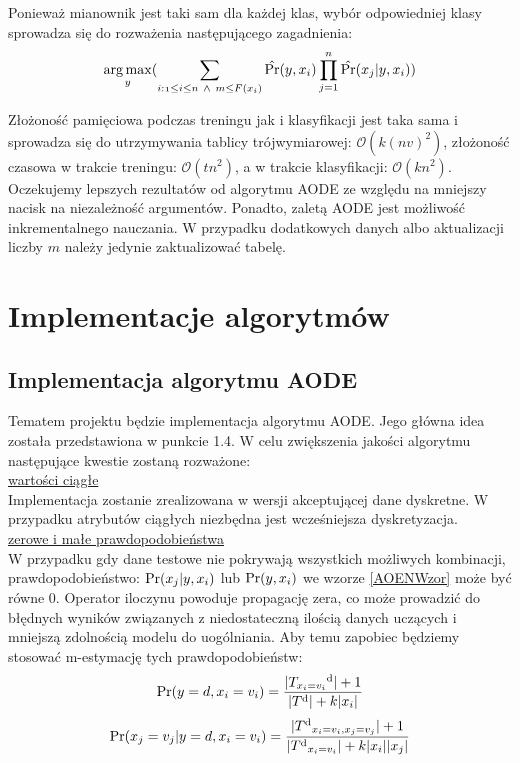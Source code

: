 \documentclass[16]{article}
\begin{document}
Ponieważ mianownik jest taki sam dla każdej klas, wybór odpowiedniej klasy sprowadza się do rozważenia następującego zagadnienia:
\begin{equation}
 \label{AOENWzor}
 \operatorname*{arg\,max}_\mathnormal{y} (\sum_{\mathnormal{i:1 \leq i \leq n \ \wedge \ m \leq F(x_{i})} } \hat{\Pr}(\mathnormal{y, x_{i}})\prod_{j=1}^{n} \hat{\Pr}(\mathnormal{x_{j}|y, x_{i}}))
\end{equation} 

Złożoność pamięciowa podczas treningu jak i klasyfikacji jest taka sama i sprowadza się do utrzymywania tablicy trójwymiarowej: $\mathcal{O}(k(nv)^{2})$, złożoność czasowa w trakcie treningu: $\mathcal{O}(tn^{2})$, a w trakcie klasyfikacji: $\mathcal{O}(kn^{2})$. \\

Oczekujemy lepszych rezultatów od algorytmu AODE ze względu na mniejszy nacisk na niezależność argumentów. Ponadto, zaletą AODE jest możliwość inkrementalnego nauczania. W przypadku dodatkowych danych albo aktualizacji liczby $m$ należy jedynie zaktualizować tabelę.

\section{Implementacje algorytmów}
\subsection{Implementacja algorytmu AODE} 
Tematem projektu będzie implementacja algorytmu AODE. Jego główna idea została przedstawiona w punkcie 1.4. W celu zwiększenia jakości algorytmu następujące kwestie zostaną rozważone: \\

\underline{wartości ciągłe} \\
Implementacja zostanie zrealizowana w wersji akceptującej dane dyskretne. W przypadku atrybutów ciągłych niezbędna jest wcześniejsza dyskretyzacja. \\

\underline{zerowe i małe prawdopodobieństwa} \\
W przypadku gdy dane testowe nie pokrywają wszystkich możliwych kombinacji, prawdopodobieństwo: ${\Pr}(\mathnormal{x_{j}|y, x_{i}})$ lub ${\Pr}(\mathnormal{y, x_{i}})$  we wzorze \eqref{AOENWzor} może być równe 0. Operator iloczynu powoduje propagację zera, co może prowadzić do błędnych wyników związanych z niedostateczną ilością danych uczących i mniejszą zdolnością modelu do uogólniania. Aby temu zapobiec będziemy stosować m-estymację tych prawdopodobieństw:
\begin{equation}
{\Pr}(\mathnormal{y=d, x_i=v_i}) = \frac{|T_{x_i=v_i}\textsuperscript{d}| + 1}{|T\textsuperscript{d}|+k|x_i|} 
\end{equation}
\begin{equation}
{\Pr}(\mathnormal{x_j=v_j | y=d, x_i=v_i}) = \frac{|T\textsuperscript{d}_{x_i=v_i, x_j=v_j}| + 1}{|T\textsuperscript{d}_{x_i=v_i}|+k|x_i||x_j|} 
\end{equation}
\end{document}
